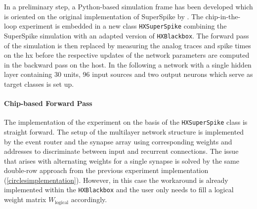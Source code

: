 In a preliminary step, a Python-based simulation frame has been developed which is oriented on the original implementation of SuperSpike by \cite{zenke2018superspike}. The chip-in-the-loop experiment is embedded in a new class \texttt{HXSuperSpike} combining the SuperSpike simulation with an adapted version of \texttt{HXBlackbox}. The forward pass of the simulation is then replaced by measuring the analog traces and spike times on the \gls{hx} before the respective updates of the network parameters are computed in the backward pass on the host. In the following a network with a single hidden layer containing 30 units, 96 input sources and two output neurons which serve as target classes is set up.


\paragraph{Chip-based Forward Pass}
The implementation of the experiment on the basis of the \texttt{HXSuperSpike} class is straight forward. The setup of the multilayer network structure is implemented by the event router and the synapse array using corresponding weights and addresses to discriminate between input and recurrent connections. The issue that arises with alternating weights for a single synapse is solved by the same double-row approach from the previous experiment implementation (\cref{circlesimplementation}). However, in this case the workaround is already implemented within the \texttt{HXBlackbox} and the user only needs to fill a logical weight matrix $W_\text{logical}$ accordingly.

